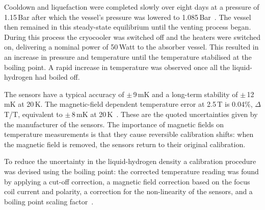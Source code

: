 Cooldown and liquefaction were completed slowly over eight days at a pressure of 1.15\,Bar after which the vessel's pressure was lowered to 1.085\,Bar~\cite{1748-0221-13-09-T09008}. The vessel then remained in this steady-state equilibrium until the venting process began. During this process the cryocooler was switched off and the heaters were switched on, delivering a nominal power of 50\,Watt to the absorber vessel. This resulted in an increase in pressure and temperature until the temperature stabilised at the boiling point. A rapid increase in temperature was observed once all the liquid-hydrogen had boiled off.

The sensors have a typical accuracy of $\mathrm{\pm}$\,9\,mK and a long-term stability of $\mathrm{\pm}$\,12\,mK at 20\,K. The magnetic-field dependent temperature error at 2.5\,T is 0.04\%, $\Delta$T/T, equivalent to $\mathrm{\pm}$\,8\,mK at 20\,K~\cite{CernoxRTDs}\cite{TemperatureMeasurement}. These are the quoted uncertainties given by the manufacturer of the sensors. The importance of magnetic fields on temperature measurements is that they cause reversible calibration shifts: when the magnetic field is removed, the sensors return to their original calibration.

To reduce the uncertainty in the liquid-hydrogen density a calibration procedure was devised using the boiling point: the corrected temperature reading was found by applying a cut-off correction, a magnetic field correction based on the focus coil current and polarity, a correction for the non-linearity of the sensors, and a boiling point scaling factor~\cite{NOTE524}. 
%
%

